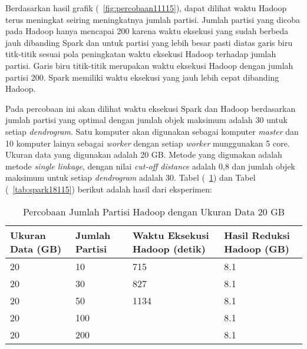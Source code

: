Berdasarkan hasil grafik (~\ref{fig:percobaan11115}), dapat dilihat waktu Hadoop terus meningkat seiring meningkatnya jumlah partisi. Jumlah partisi yang dicoba pada Hadoop hanya mencapai 200 karena waktu eksekusi yang sudah berbeda jauh dibanding Spark dan untuk partisi yang lebih besar pasti diatas garis biru titk-titik sesuai pola peningkatan waktu eksekusi Hadoop terhadap jumlah partisi. Garis biru titik-titik merupakan waktu eksekusi Hadoop dengan jumlah partisi 200. Spark memiliki waktu eksekusi yang jauh lebih cepat dibanding Hadoop. 




Pada percobaan ini akan dilihat waktu eksekusi Spark dan Hadoop berdasarkan jumlah partisi yang optimal dengan jumlah objek maksimum adalah 30 untuk setiap \textit{dendrogram}. Satu komputer akan digunakan sebagai komputer \textit{master} dan 10 komputer lainya sebagai \textit{worker} dengan setiap \textit{worker} munggunakan 5 core. Ukuran data yang digunakan adalah 20 GB. Metode yang digunakan adalah metode \textit{single linkage}, dengan nilai \textit{cut-off distance} adalah 0,8 dan jumlah objek maksimum untuk setiap \textit{dendrogram} adalah 30. Tabel (~\ref{tab:spark17115}) dan Tabel (~\ref{tab:spark18115}) berikut adalah hasil dari eksperimen:





\begin{table}[H] 
	\centering 
	\caption{Percobaan Jumlah Partisi Hadoop dengan Ukuran Data 20 GB}
	\label{tab:spark17115}
	\begin{tabular}{|p{3cm}|p{3cm}|p{4cm}|p{4cm}|}
\hline
Ukuran Data (GB) & Jumlah Partisi &  Waktu Eksekusi Hadoop (detik) & Hasil Reduksi Hadoop (GB)\\
\hline
20 & 10 & 715  & 8.1  \\
\hline
20 & 30 & 827  & 8.1  \\
\hline
20 & 50 & 1134  & 8.1  \\
\hline
20 & 100 &   & 8.1  \\
\hline
20 & 200 &   & 8.1  \\
\hline


\hline

	\end{tabular} 
\end{table}




